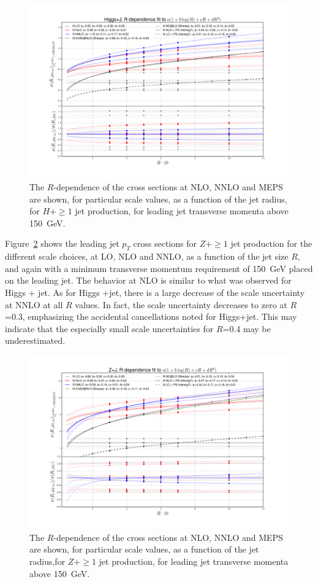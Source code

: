 \documentclass[aps,prd,onecolumn,fleqn,superscriptaddress,groupedaddress,nofootinbib,preprintnumbers,nobalancelastpage]{revtex4}
\begin{document}
\begin{figure}[t]
  \centerline{\includegraphics[width=\textwidth]{plots/Fig_V_17_Higgs.pdf}}
  \caption{The $R$-dependence of the cross sections at NLO, NNLO and MEPS are shown, for 
particular scale values, as a function of the jet radius, for $H +\ge1$ jet production, for leading jet transverse momenta above 150~GeV.  
\label{fig:AccidentalScaleComp_H}}
\end{figure}

Figure~\ref{fig:AccidentalScaleComp_Z} shows the leading jet $p_T$ cross sections for $Z +\ge1$ jet production for
the different scale choices, at LO,  NLO and NNLO, as a function of the jet size $R$, and 
again with  a minimum transverse momentum requirement of 150~GeV 
placed on the leading jet. The behavior at NLO is similar to what was observed for Higgs + jet. As for Higgs
+jet, there is a large decrease of the scale uncertainty at NNLO at all $R$ values. In fact, the scale
uncertainty decreases to zero at $R$=0.3, emphasizing the accidental cancellations noted for Higgs+jet. This 
may indicate that the especially small scale uncertainties for $R$=0.4 may be underestimated. 

\begin{figure}[t]
  \centerline{\includegraphics[width=\textwidth]{plots/Fig_V_17_Z.pdf}}
  \caption{The $R$-dependence of the cross sections at NLO, NNLO and MEPS are shown, for 
particular scale values, as a function of the jet radius,for $Z +\ge1$ jet production, for leading jet transverse momenta above 150~GeV.   \label{fig:AccidentalScaleComp_Z}}
\end{figure}
\end{document}
